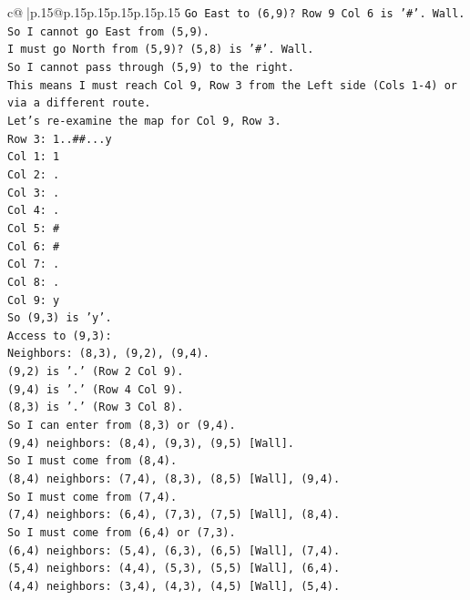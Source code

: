 \documentclass{article}
\begin{document}
{\begin{supertabular}{c@{$\;$}|p{.15\linewidth}@{}p{.15\linewidth}p{.15\linewidth}p{.15\linewidth}p{.15\linewidth}p{.15\linewidth}}
{{{\texttt{Go East to (6,9)? Row 9 Col 6 is '\#'. Wall.} \\
\texttt{So I cannot go East from (5,9).} \\
\texttt{I must go North from (5,9)? (5,8) is '\#'. Wall.} \\
\texttt{So I cannot pass through (5,9) to the right.} \\
\texttt{This means I must reach Col 9, Row 3 from the Left side (Cols 1{-}4) or via a different route.} \\
\texttt{Let's re{-}examine the map for Col 9, Row 3.} \\
\texttt{Row 3: 1..\#\#...y} \\
\texttt{Col 1: 1} \\
\texttt{Col 2: .} \\
\texttt{Col 3: .} \\
\texttt{Col 4: .} \\
\texttt{Col 5: \#} \\
\texttt{Col 6: \#} \\
\texttt{Col 7: .} \\
\texttt{Col 8: .} \\
\texttt{Col 9: y} \\
\texttt{So (9,3) is 'y'.} \\
\texttt{Access to (9,3):} \\
\texttt{Neighbors: (8,3), (9,2), (9,4).} \\
\texttt{(9,2) is '.' (Row 2 Col 9).} \\
\texttt{(9,4) is '.' (Row 4 Col 9).} \\
\texttt{(8,3) is '.' (Row 3 Col 8).} \\
\texttt{So I can enter from (8,3) or (9,4).} \\
\texttt{(9,4) neighbors: (8,4), (9,3), (9,5) {[}Wall{]}.} \\
\texttt{So I must come from (8,4).} \\
\texttt{(8,4) neighbors: (7,4), (8,3), (8,5) {[}Wall{]}, (9,4).} \\
\texttt{So I must come from (7,4).} \\
\texttt{(7,4) neighbors: (6,4), (7,3), (7,5) {[}Wall{]}, (8,4).} \\
\texttt{So I must come from (6,4) or (7,3).} \\
\texttt{(6,4) neighbors: (5,4), (6,3), (6,5) {[}Wall{]}, (7,4).} \\
\texttt{(5,4) neighbors: (4,4), (5,3), (5,5) {[}Wall{]}, (6,4).} \\
\texttt{(4,4) neighbors: (3,4), (4,3), (4,5) {[}Wall{]}, (5,4).} \\
}}}
\end{supertabular}}
\end{document}

